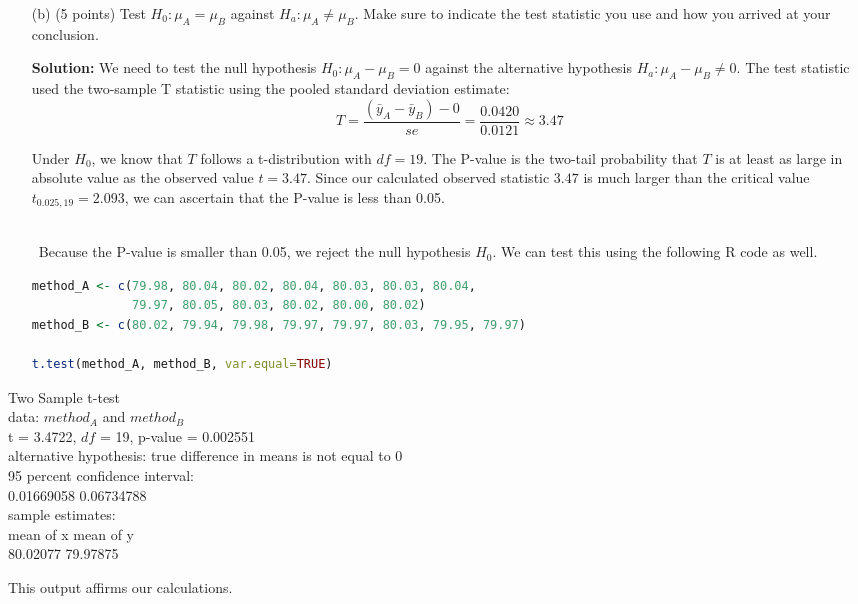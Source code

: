 \documentclass[12pt,letterpaper]{article}
\begin{document}
\begin{enumerate}[leftmargin=*]
\begin{itemize}
	\item[(b)] (5 points) Test $H_0: \mu_A = \mu_B$ against $H_a: \mu_A \neq \mu_B$. Make sure to indicate the test statistic you use and how you arrived at your conclusion.
 
 \textbf{Solution:}
 We need to test the null hypothesis $H_0: \mu_A - \mu_B = 0$ against the alternative hypothesis $H_a: \mu_A - \mu_B \neq 0$.
 The test statistic used the two-sample T statistic using the pooled standard deviation estimate:
 \[ T = \frac{(\bar{y}_A - \bar{y}_B) - 0}{se} = \frac{0.0420}{0.0121} \approx 3.47 \]
 
 Under $H_0$, we know that $T$ follows a t-distribution with $df = 19$. The P-value is the two-tail probability that $T$ is at least as large in absolute value as the observed value $t = 3.47$. 
 Since our calculated observed statistic $3.47$ is much larger than the critical value $t_{0.025, 19} = 2.093$, we can ascertain that the P-value is less than 0.05. 
 
 \\\ Because the P-value is smaller than 0.05, we reject the null hypothesis $H_0$. We can test this using the following R code as well.
 
\begin{lstlisting}[language=R]
method_A <- c(79.98, 80.04, 80.02, 80.04, 80.03, 80.03, 80.04, 
              79.97, 80.05, 80.03, 80.02, 80.00, 80.02)
method_B <- c(80.02, 79.94, 79.98, 79.97, 79.97, 80.03, 79.95, 79.97)

t.test(method_A, method_B, var.equal=TRUE)
\end{lstlisting}
\end{itemize} 

Two Sample t-test
\\data: $method_A$ and $method_B$
\\ t = 3.4722, $df$ = 19, p-value = 0.002551
\\ alternative hypothesis: true difference in means is not equal to 0
\\ 95 percent confidence interval:
\\ 0.01669058 0.06734788
\\ sample estimates:
\\mean of x mean of y 
\\ 80.02077  79.97875 

This output affirms our calculations.


\end{enumerate}
\end{document}

